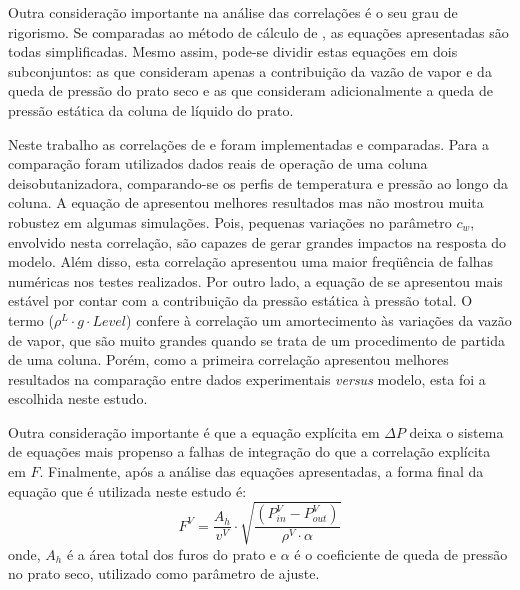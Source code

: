 Outra consideração importante na análise das correlações é o seu grau de rigorismo. Se comparadas ao método
de cálculo de , as equações apresentadas são todas
simplificadas. Mesmo assim, pode-se dividir estas equações em dois subconjuntos:
as que consideram apenas a contribuição da vazão de vapor e da queda de pressão do prato seco e as que consideram adicionalmente a queda de pressão estática da coluna
de líquido do prato.

Neste trabalho as correlações de  e  foram implementadas e
comparadas. Para a comparação foram utilizados dados reais de operação de uma coluna deisobutanizadora,
comparando-se os perfis de temperatura e pressão ao longo da coluna.
A equação de  apresentou melhores resultados mas não mostrou muita
robustez em algumas simulações. Pois, pequenas variações no parâmetro $c_w$, envolvido nesta correlação,
são capazes de gerar grandes impactos na resposta do modelo. Além disso, esta correlação
apresentou uma maior freqüência de falhas numéricas nos testes realizados.
Por outro lado, a equação de  se apresentou mais estável por contar com a contribuição da pressão estática à pressão total. O termo ($\rho^L \cdot g \cdot Level$)
confere à correlação um amortecimento às variações da vazão de vapor, que são muito grandes
quando se trata de um procedimento de partida de uma coluna.
Porém, como a primeira correlação apresentou melhores resultados na comparação entre dados experimentais \textit{versus}
modelo, esta foi a escolhida neste estudo.

Outra consideração importante é que a equação explícita em $\Delta P$
deixa o sistema de equações mais propenso a falhas de integração do que a correlação explícita em $F$.
Finalmente, após a análise das equações apresentadas, a forma final da equação que é utilizada neste estudo é:
\begin{equation}
\label{eq:vapfinal}
F^V = \dfrac{A_h}{v^V} \cdot \sqrt{\dfrac{\left( P_{in}^V - P_{out}^V\right)}{\rho^V \cdot \alpha}}
\end{equation}
onde, $A_h$ é a área total dos furos do prato e $\alpha$ é o coeficiente de
queda de pressão no prato seco, utilizado como parâmetro de ajuste.

